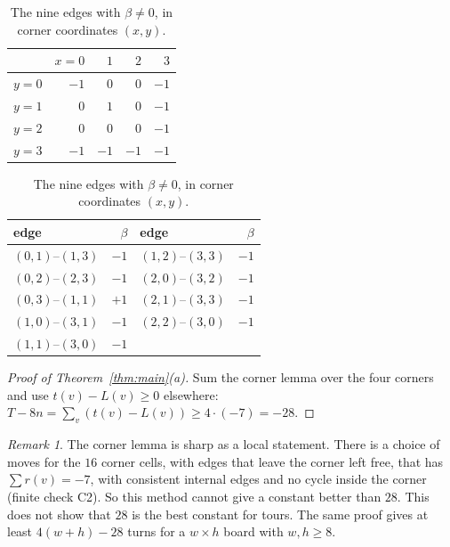 \documentclass[11pt]{article}
\theoremstyle{definition}
\theoremstyle{remark}
\newtheorem{remark}[theorem]{Remark}
\begin{document}
\begin{table}[t]
\centering
\begin{minipage}[t]{0.38\textwidth}
\centering
\begin{tabular}{c|rrrr}
 & $x=0$ & $1$ & $2$ & $3$\\\midrule
$y=0$ & $-1$ & $0$ & $0$ & $-1$\\
$y=1$ & $0$ & $1$ & $0$ & $-1$\\
$y=2$ & $0$ & $0$ & $0$ & $-1$\\
$y=3$ & $-1$ & $-1$ & $-1$ & $-1$
\end{tabular}
\caption{The numbers $\alpha(x,y)$. Their sum is $-7$.}
\label{tab:alpha}
\end{minipage}\hfill
\begin{minipage}[t]{0.55\textwidth}
\centering
\begin{tabular}{lr@{\qquad}lr}
\toprule
edge & $\beta$ & edge & $\beta$\\\midrule
$(0,1)$--$(1,3)$ & $-1$ & $(1,2)$--$(3,3)$ & $-1$\\
$(0,2)$--$(2,3)$ & $-1$ & $(2,0)$--$(3,2)$ & $-1$\\
$(0,3)$--$(1,1)$ & $+1$ & $(2,1)$--$(3,3)$ & $-1$\\
$(1,0)$--$(3,1)$ & $-1$ & $(2,2)$--$(3,0)$ & $-1$\\
$(1,1)$--$(3,0)$ & $-1$ & & \\\bottomrule
\end{tabular}
\caption{The nine edges with $\beta\ne0$, in corner coordinates $(x,y)$.}
\label{tab:beta}
\end{minipage}
\end{table}

\begin{proof}[Proof of Theorem~\ref{thm:main}(a)]
Sum the corner lemma over the four corners and use $t(v)-L(v)\ge0$ elsewhere:
$T-8n=\sum_v(t(v)-L(v))\ge 4\cdot(-7)=-28$.
\end{proof}

\begin{remark}
The corner lemma is sharp as a local statement.
There is a choice of moves for the $16$ corner cells, with edges that leave the corner left free, that has $\sum r(v)=-7$, with consistent internal edges and no cycle inside the corner (finite check C2).
So this method cannot give a constant better than $28$.
This does not show that $28$ is the best constant for tours.
The same proof gives at least $4(w+h)-28$ turns for a $w\times h$ board with $w,h\ge8$.
\end{remark}
\end{document}
